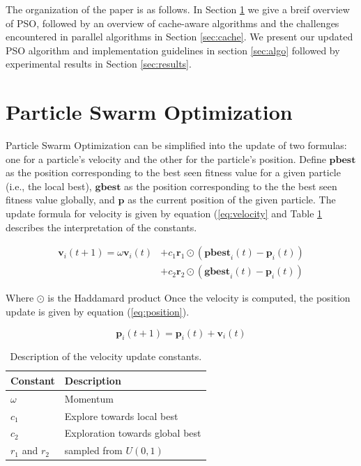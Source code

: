 The organization of the paper is as follows. In Section \ref{sec:pso} we give a
breif overview of PSO, followed by an overview of cache-aware algorithms and the
challenges encountered in parallel algorithms in Section \ref{sec:cache}. We
present our updated PSO algorithm and implementation guidelines in section
\ref{sec:algo} followed by experimental results in Section \ref{sec:results}.

\section{Particle Swarm Optimization}\label{sec:pso}
Particle Swarm Optimization can be simplified into the update of two formulas:
one for a particle's velocity and the other for the particle's position. Define
$\textbf{pbest}$ as the position corresponding to the best seen fitness value
for a given particle (i.e., the local best), $\textbf{gbest}$ as the position
corresponding to the the best seen fitness value globally, and $\textbf{p}$ as
the current position of the given particle. The update formula for velocity is
given by equation (\ref{eq:velocity} and Table \ref{tab:constants} describes
the interpretation of the constants.

\begin{align}
  \textbf{v}_i(t+1) = \omega \textbf{v}_i (t) & +
                                                c_1 \textbf{r}_1\odot (\textbf{pbest}_i(t) -
                                                \textbf{p}_i(t))
  \\\label{eq:velocity}
  &+ c_2 \textbf{r}_2 \odot(\textbf{gbest}_i(t) - \textbf{p}_i(t))\nonumber
\end{align}

Where $\odot$ is the Haddamard product
Once the velocity is computed, the position update is given by equation
(\ref{eq:position}).

\begin{equation}\label{eq:position}
  \textbf{p}_i(t+1) = \textbf{p}_i(t) + \textbf{v}_i(t)
\end{equation}

\begin{table}
  \caption{Description of the velocity update constants.}\label{tab:constants}
  \begin{tabular}{ll}\toprule
  \textbf{Constant} & \textbf{Description}\\\midrule
  $\omega$ & Momentum\\
  $c_1$ & Explore towards local best\\
  $c_2$ & Exploration towards global best\\
  $r_1$ and $r_2$ & sampled from $U(0,1)$\\\bottomrule
  \end{tabular}
\end{table}

